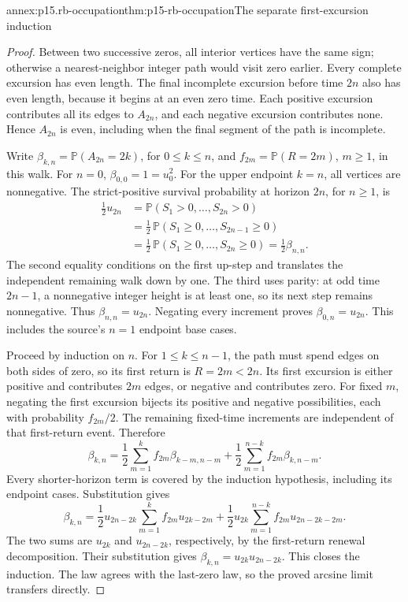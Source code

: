\begin{annexitem}{annex:p15.rb-occupation}{thm:p15-rb-occupation}{The separate first-excursion induction}
\begin{proof}
Between two successive zeros, all interior vertices have the
same sign; otherwise a nearest-neighbor integer path would visit
zero earlier. Every complete excursion has even length.
The final incomplete excursion before time \(2n\) also has
even length, because it begins at an even zero time.
Each positive excursion contributes all its edges to \(A_{2n}\),
and each negative excursion contributes none. Hence \(A_{2n}\)
is even, including when the final segment of the path is incomplete.

Write \(\beta_{k,n}=\mathbb P(A_{2n}=2k)\), for \(0\leq k\leq n\),
and \(f_{2m}=\mathbb P(R=2m)\), \(m\geq1\), in this walk.
For \(n=0\), \(\beta_{0,0}=1=u_0^2\).
For the upper endpoint \(k=n\), all vertices are nonnegative.
The strict-positive survival probability at horizon \(2n\),
for \(n\geq1\), is
\[
 \begin{split}
 \tfrac12u_{2n}
 &=\mathbb P(S_1>0,\ldots,S_{2n}>0)\\
 &=\tfrac12\,\mathbb P(S_1\geq0,\ldots,S_{2n-1}\geq0)\\
 &=\tfrac12\,\mathbb P(S_1\geq0,\ldots,S_{2n}\geq0)
 =\tfrac12\beta_{n,n}.
 \end{split}
 \]
The second equality conditions on the first up-step and translates
the independent remaining walk down by one. The third uses parity:
at odd time \(2n-1\), a nonnegative integer height is at least
one, so its next step remains nonnegative.
Thus \(\beta_{n,n}=u_{2n}\).
Negating every increment proves \(\beta_{0,n}=u_{2n}\).
This includes the source's \(n=1\) endpoint base cases.

Proceed by induction on \(n\). For \(1\leq k\leq n-1\),
the path must spend edges on both sides of zero, so its first
return is \(R=2m<2n\). Its first excursion is either positive
and contributes \(2m\) edges, or negative and contributes zero.
For fixed \(m\), negating the first excursion bijects its
positive and negative possibilities, each with probability
\(f_{2m}/2\). The remaining fixed-time increments are independent
of that first-return event. Therefore
\[
 \beta_{k,n}
 =\frac12\sum_{m=1}^k f_{2m}\beta_{k-m,n-m}
  +\frac12\sum_{m=1}^{n-k} f_{2m}\beta_{k,n-m}.
 \]
Every shorter-horizon term is covered by the induction
hypothesis, including its endpoint cases.
Substitution gives
\[
 \beta_{k,n}
 =\frac12u_{2n-2k}\sum_{m=1}^k f_{2m}u_{2k-2m}
  +\frac12u_{2k}\sum_{m=1}^{n-k}f_{2m}u_{2n-2k-2m}.
 \]
The two sums are \(u_{2k}\) and \(u_{2n-2k}\), respectively,
by the first-return renewal decomposition.
Their substitution gives \(\beta_{k,n}=u_{2k}u_{2n-2k}\).
This closes the induction. The law agrees with the last-zero
law, so the proved arcsine limit transfers directly.
\end{proof}
\end{annexitem}

